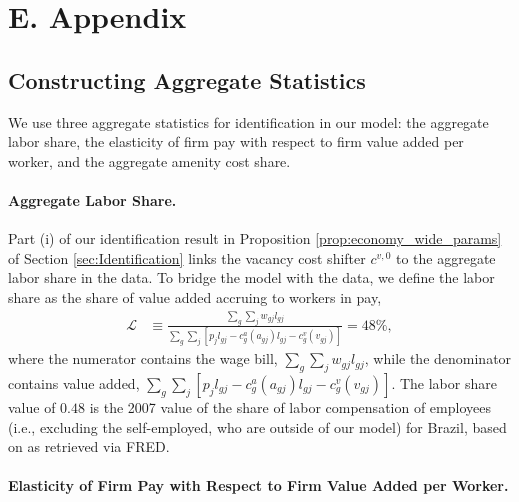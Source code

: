 

\clearpage
\section{E. {\sectionsix} Appendix\label{app:estimation}}
\renewcommand*{\thepage}{\Alph{section}\arabic{page}}
\setcounter{page}{1}


\subsection{Constructing Aggregate Statistics\label{subsec:external}}

We use three aggregate statistics for identification in our model: the aggregate labor share, the elasticity of firm pay with respect to firm value added per worker, and the aggregate amenity cost share.


\paragraph{Aggregate Labor Share.}

Part (i) of our identification result in Proposition \ref{prop:economy_wide_params} of Section \ref{sec:Identification} links the vacancy cost shifter $c^{v,0}$ to the aggregate labor share in the data. To bridge the model with the data, we define the labor share as the share of value added accruing to workers in pay,
%
\begin{align}
    \mathcal{L}  &\equiv \frac{ \sum_{g}\sum_{j}w_{gj}l_{gj} }{ \sum_{g}\sum_{j} \left[ p_{j}l_{gj} - c^{a}_{g}(a_{gj})l_{gj} - c_{g}^{v}(v_{gj}) \right] } = 48\%, \label{eq:labor_share_app}
\end{align}
%
where the numerator contains the wage bill, $\sum_{g}\sum_{j}w_{gj}l_{gj}$, while the denominator contains value added, $\sum_{g}\sum_{j} [ p_{j}l_{gj} - c^{a}_{g}(a_{gj})l_{gj} - c_{g}^{v}(v_{gj}) ]$. The labor share value of $0.48$ is the 2007 value of the share of labor compensation of employees (i.e., excluding the self-employed, who are outside of our model) for Brazil, based on \citet{FeenstraInklaarTimmer2015} as retrieved via FRED.


\paragraph{Elasticity of Firm Pay with Respect to Firm Value Added per Worker.}

